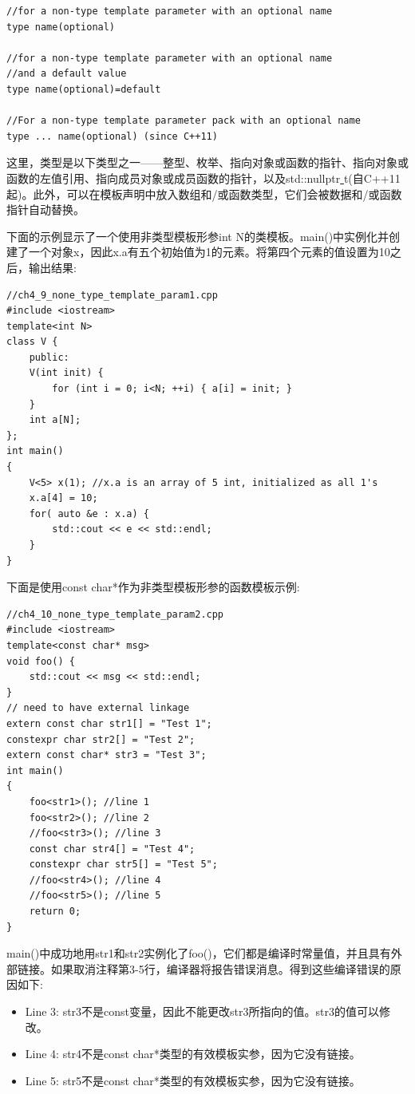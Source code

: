 \begin{lstlisting}[caption={}]
//for a non-type template parameter with an optional name
type name(optional)

//for a non-type template parameter with an optional name
//and a default value
type name(optional)=default

//For a non-type template parameter pack with an optional name
type ... name(optional) (since C++11)
\end{lstlisting}

这里，类型是以下类型之一——整型、枚举、指向对象或函数的指针、指向对象或函数的左值引用、指向成员对象或成员函数的指针，以及std::nullptr\underline{ }t(自C++11起)。此外，可以在模板声明中放入数组和/或函数类型，它们会被数据和/或函数指针自动替换。 \par
下面的示例显示了一个使用非类型模板形参int N的类模板。main()中实例化并创建了一个对象x，因此x.a有五个初始值为1的元素。将第四个元素的值设置为10之后，输出结果:\par

\begin{lstlisting}[caption={}]
//ch4_9_none_type_template_param1.cpp
#include <iostream>
template<int N>
class V {
	public:
	V(int init) {
		for (int i = 0; i<N; ++i) { a[i] = init; }
	}
	int a[N];
};
int main()
{
	V<5> x(1); //x.a is an array of 5 int, initialized as all 1's
	x.a[4] = 10;
	for( auto &e : x.a) {
		std::cout << e << std::endl;
	}
}
\end{lstlisting}

下面是使用const char*作为非类型模板形参的函数模板示例: \par

\begin{lstlisting}[caption={}]
//ch4_10_none_type_template_param2.cpp
#include <iostream>
template<const char* msg>
void foo() {
	std::cout << msg << std::endl;
}
// need to have external linkage
extern const char str1[] = "Test 1";
constexpr char str2[] = "Test 2";
extern const char* str3 = "Test 3";
int main()
{
	foo<str1>(); //line 1
	foo<str2>(); //line 2
	//foo<str3>(); //line 3
	const char str4[] = "Test 4";
	constexpr char str5[] = "Test 5";
	//foo<str4>(); //line 4
	//foo<str5>(); //line 5
	return 0;
}
\end{lstlisting}

main()中成功地用str1和str2实例化了foo()，它们都是编译时常量值，并且具有外部链接。如果取消注释第3-5行，编译器将报告错误消息。得到这些编译错误的原因如下: \par

\begin{itemize}
	\item Line 3:  str3不是const变量，因此不能更改str3所指向的值。str3的值可以修改。
	\item Line 4:  str4不是const char*类型的有效模板实参，因为它没有链接。
	\item Line 5:  str5不是const char*类型的有效模板实参，因为它没有链接。
\end{itemize}

